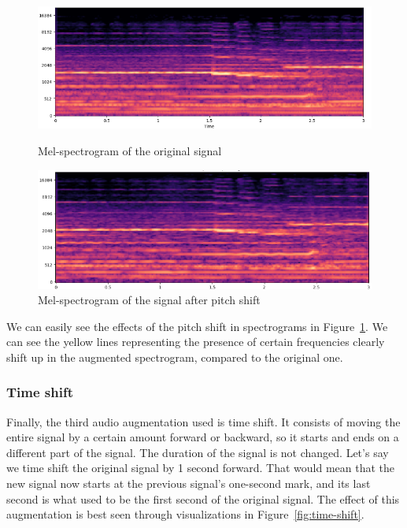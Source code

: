 \begin{figure}[H]
        \begin{minipage}{0.49\textwidth}
            \centering
            \includegraphics[width=\linewidth]{images/pitch-shift-original-audio-spectogram.png}
            \caption*{Mel-spectrogram of the original signal}
        \end{minipage}%
        \hfill%
        \begin{minipage}{0.49\textwidth}
            \centering
            \includegraphics[width=\linewidth]{images/pitch-shift-augmented-audio-spectogram.png}
            \caption*{Mel-spectrogram of the signal after pitch shift}
        \end{minipage}
                
        
        \label{fig:pitch-shift}
        
    \end{figure}

We can easily see the effects of the pitch shift in spectrograms in Figure~\ref{fig:pitch-shift}. We can see the yellow lines representing the presence of certain frequencies clearly shift up in the augmented spectrogram, compared to the original one.

\subsubsection{Time shift}

Finally, the third audio augmentation used is time shift. It consists of moving the entire signal by a certain amount forward or backward, so it starts and ends on a different part of the signal. The duration of the signal is not changed.  Let's say we time shift the original signal by 1 second forward. That would mean that the new signal now starts at the previous signal's one-second mark, and its last second is what used to be the first second of the original signal. The effect of this augmentation is best seen through visualizations in Figure~\ref{fig:time-shift}.

